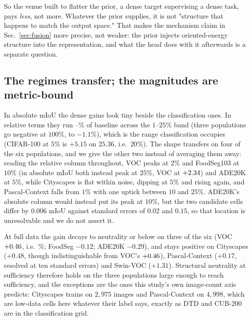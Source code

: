 So the venue built to flatter the prior, a dense target supervising a dense
task, pays \emph{less}, not more. Whatever the prior supplies, it is not
"structure that happens to match the output space." That makes the mechanism
claim in Sec.~\ref{sec:fusion} more precise, not weaker: the prior injects
oriented-energy structure into the representation, and what the head does with
it afterwards is a separate question.

\subsection{The regimes transfer; the magnitudes are metric-bound}
In absolute mIoU the dense gains look tiny beside the classification ones. In
relative terms they run \denseRelLo--\denseRelHi\% of baseline across the
$1$--$25\%$ band (three populations go negative at $100\%$, to $-1.1\%$),
which is the
range classification occupies (CIFAR-100 at $5\%$ is $+5.15$ on $25.36$, i.e.\
$20\%$). The shape transfers on four of the six populations, and we give the
other two instead of averaging them away: reading the relative column
throughout, VOC peaks at $2\%$ and FoodSeg103 at $10\%$ (in absolute mIoU both
instead peak at $25\%$, VOC at $+2.34$) and ADE20K at $5\%$, while
Cityscapes is flat within noise, dipping
at $5\%$ and rising again, and Pascal-Context falls from $1\%$ with one
uptick between $10$ and $25\%$.
ADE20K's absolute column would instead put its peak at $10\%$, but the two
candidate cells differ by $0.006$ mIoU against standard errors of $0.02$ and
$0.15$, so that location is unresolvable and we do not assert it.

At full data the gain decays to neutrality or below on three of the six (VOC
$+0.46$, i.e.\ \denseVocFullRel\%; FoodSeg $-0.12$; ADE20K $-0.29$),
and stays positive on Cityscapes ($+0.48$, though indistinguishable from
VOC's $+0.46$), Pascal-Context ($+0.17$, resolved
at ten standard errors) and Swin-VOC ($+1.31$). Structural neutrality at
sufficiency therefore holds on the three populations large enough to reach
sufficiency, and the exceptions are the ones this study's own image-count axis
predicts: Cityscapes trains on $2{,}975$ images and Pascal-Context on
$4{,}998$, which are low-data cells here whatever their label says, exactly as
DTD and CUB-200 are in the classification grid.

